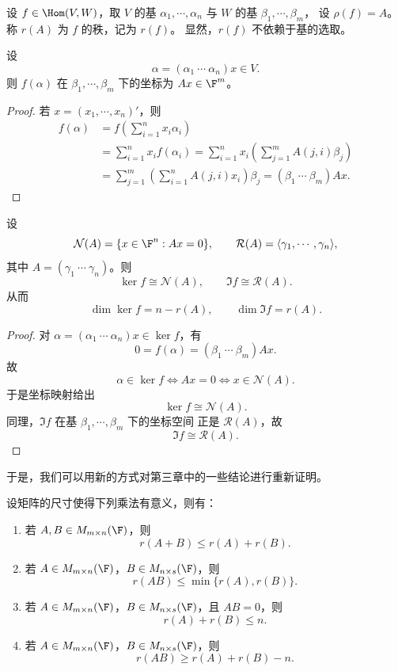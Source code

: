 \begin{definition}
	设 $f\in\Hom(V,W)$，取 $V$ 的基
	$\alpha_1,\cdots,\alpha_n$ 与 $W$ 的基 $\beta_1,\cdots,\beta_m$，
	设 $\rho(f)=A$。称 $r(A)$ 为 $f$ 的秩，记为 $r(f)$。
	显然，$r(f)$ 不依赖于基的选取。
\end{definition}

\begin{lemma}
	设
	\[
	\alpha=(\alpha_1\ \cdots\ \alpha_n)x\in V.
	\]
	则 $f(\alpha)$ 在 $\beta_1,\cdots,\beta_m$ 下的坐标为 $Ax\in\F^m$。
\end{lemma}

\begin{proof}
	若 $x=(x_1,\cdots,x_n)'$，则
	\[
	\begin{aligned}
		f(\alpha)
		&=f\left(\sum_{i=1}^{n}x_i\alpha_i\right)\\
		&=\sum_{i=1}^{n}x_i f(\alpha_i)=\sum_{i=1}^{n}x_i\left(\sum_{j=1}^{m}A(j,i)\beta_j\right)\\
		&=\sum_{j=1}^{m}\left(\sum_{i=1}^{n}A(j,i)x_i\right)\beta_j=(\beta_1\ \cdots\ \beta_m)Ax.
	\end{aligned}
	\]
\end{proof}

\begin{proposition}
	设
	\[
	\mathcal{N}(A)=\{x\in\F^n:Ax=0\},
	\qquad
	\mathcal{R}(A)=\langle \gamma_1,\cdots,\gamma_n\rangle,
	\]
	其中 $A=(\gamma_1\ \cdots\ \gamma_n)$。则
	\[
	\ker f\cong \mathcal{N}(A),
	\qquad
	\Im f\cong \mathcal{R}(A).
	\]
	从而
	\[
	\dim\ker f=n-r(A),
	\qquad
	\dim\Im f=r(A).
	\]
\end{proposition}

\begin{proof}
	对 $\alpha=(\alpha_1\ \cdots\ \alpha_n)x\in\ker f$，有
	\[
	0=f(\alpha)=(\beta_1\ \cdots\ \beta_m)Ax.
	\]
	故
	\[
	\alpha\in\ker f
	\Longleftrightarrow
	Ax=0
	\Longleftrightarrow
	x\in\mathcal{N}(A).
	\]
	于是坐标映射给出
	\[
	\ker f\cong\mathcal{N}(A).
	\]
	同理，$\Im f$ 在基 $\beta_1,\cdots,\beta_m$ 下的坐标空间
	正是 $\mathcal{R}(A)$，故
	\[
	\Im f\cong\mathcal{R}(A).
	\]
\end{proof}

于是，我们可以用新的方式对第三章中的一些结论进行重新证明。

\begin{example}
	设矩阵的尺寸使得下列乘法有意义，则有：
	\begin{enumerate}
		\item 若 $A,B\in M_{m\times n}(\F)$，则
		\[
		r(A+B)\leq r(A)+r(B).
		\]
		\item 若 $A\in M_{m\times n}(\F)$，$B\in M_{n\times s}(\F)$，则
		\[
		r(AB)\leq \min\{r(A),r(B)\}.
		\]
		\item 若 $A\in M_{m\times n}(\F)$，$B\in M_{n\times s}(\F)$，且 $AB=0$，则
		\[
		r(A)+r(B)\leq n.
		\]
		\item 若 $A\in M_{m\times n}(\F)$，$B\in M_{n\times s}(\F)$，则
		\[
		r(AB)\geq r(A)+r(B)-n.
		\]
	\end{enumerate}
\end{example}

